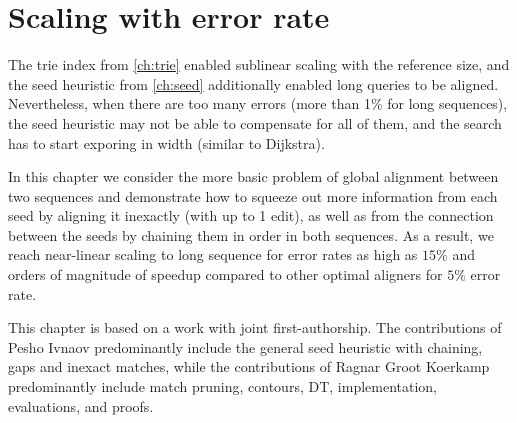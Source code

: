 \chapter{Scaling with error rate} \label{ch:global}

\graphicspath{{\dir/}}

The trie index from \cref{ch:trie} enabled sublinear scaling with the reference
size, and the seed heuristic from \cref{ch:seed} additionally enabled long
queries to be aligned. Nevertheless, when there are too many errors (more than
1\% for long sequences), the seed heuristic may not be able to compensate for
all of them, and the search has to start exporing in width (similar to
Dijkstra).

In this chapter we consider the more basic problem of global alignment between
two sequences and demonstrate how to squeeze out more information from each seed
by aligning it inexactly (with up to 1 edit), as well as from the connection
between the seeds by chaining them in order in both sequences. As a result, we
reach near-linear scaling to long sequence for error rates as high as $15\%$ and
orders of magnitude of speedup compared to other optimal aligners for $5\%$
error rate. 

This chapter is based on a work with joint first-authorship. The contributions
of Pesho Ivnaov predominantly include the general seed heuristic with chaining,
gaps and inexact matches, while the contributions of Ragnar Groot Koerkamp
predominantly include match pruning, contours, DT, implementation, evaluations,
and proofs.

%
%
%
%
%






